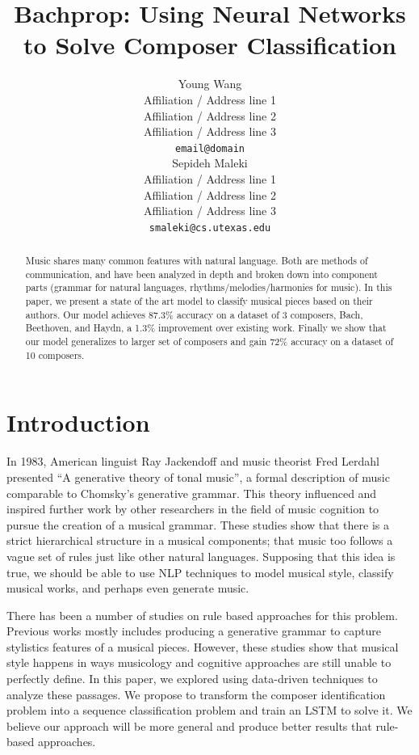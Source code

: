 \documentclass[11pt,a4paper]{article}
\title{Bachprop: Using Neural Networks to Solve Composer Classification}
\author{Young Wang \\
  Affiliation / Address line 1 \\
  Affiliation / Address line 2 \\
  Affiliation / Address line 3 \\
  {\tt email@domain} \\\And
  Sepideh Maleki \\
  Affiliation / Address line 1 \\
  Affiliation / Address line 2 \\
  Affiliation / Address line 3 \\
  {\tt smaleki@cs.utexas.edu} \\}
\date{}
\begin{document}
\maketitle
\begin{abstract}
Music shares many common features with natural language. Both are methods of communication, and have been analyzed in depth and broken down into component parts (grammar for natural languages, rhythms/melodies/harmonies for music). In this paper, we present a state of the art model to classify musical pieces based on their authors. Our model achieves 87.3\% accuracy on a dataset of 3 composers, Bach, Beethoven, and Haydn, a 1.3\% improvement over existing work. Finally we show that our model generalizes to larger set of composers and gain 72\% accuracy on a dataset of 10 composers.
\end{abstract}

\section{Introduction}


In 1983, American linguist Ray Jackendoff and music theorist Fred Lerdahl presented ``A generative theory of tonal music'', a formal description of music comparable to Chomsky's generative grammar. This theory influenced and inspired further work by other researchers in the field of music cognition to pursue the creation of a musical grammar. These studies show that there is a strict hierarchical  structure in a musical components; that music too follows a vague set of rules just like other natural languages. Supposing that this idea is true, we should be able to use NLP techniques to model musical style, classify musical works, and perhaps even generate music.

There has been a number of studies on rule based approaches for this problem. Previous works mostly includes producing a generative grammar to capture stylistics features of a musical pieces. However, these studies show that musical style happens in ways musicology and cognitive approaches are still unable to perfectly define. In this paper, we explored using  data-driven techniques to analyze these passages. We propose to transform the composer identification problem into a sequence classification problem and train an LSTM to solve it.  We believe our approach will be more general and produce better results that rule-based approaches.
\end{document}
